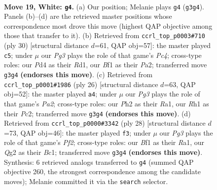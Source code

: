 \documentclass[11pt]{article}
\begin{document}
\begin{figure}[p]\centering
\begin{subfigure}{0.46\textwidth}\centering
\resizebox{\linewidth}{!}{%
\newchessgame
\chessboard[
  setfen={rnb3kr/1p1n4/2p1p3/p2p2qp/N2P4/6P1/PPP2NQP/1K1R1B1R w - - 5 19},
  showmover=false,
  pgfstyle=straightmove, color=movearrow, markmove={g3-g4}
]}
\caption{}
\end{subfigure}\hfill
\begin{subfigure}{0.46\textwidth}\centering
\resizebox{\linewidth}{!}{%
\newchessgame
\chessboard[
  setfen={r3k2r/1pq1bppp/pn2pn2/8/1PPN4/2N1B2P/P3QPP1/R2R2K1 w kq - 1 16},
  showmover=false,
  pgfstyle=straightmove, color=movearrow, markmove={c4-c5}
]}
\caption{}
\end{subfigure}
\\[4pt]
\begin{subfigure}{0.46\textwidth}\centering
\resizebox{\linewidth}{!}{%
\newchessgame
\chessboard[
  setfen={r3k2r/p3bppp/q1p1pn2/3p4/3P1B2/5Q1P/PPP1NPP1/R4RK1 w kq - 2 14},
  showmover=false,
  pgfstyle=straightmove, color=movearrow, markmove={a2-a4}
]}
\caption{}
\end{subfigure}\hfill
\begin{subfigure}{0.46\textwidth}\centering
\resizebox{\linewidth}{!}{%
\newchessgame
\chessboard[
  setfen={r3k2r/pp1nn1p1/5q1p/3p4/3Pp3/2P4N/P4PPP/R1BQ1RK1 w kq - 2 15},
  showmover=false,
  pgfstyle=straightmove, color=movearrow, markmove={f2-f3}
]}
\caption{}
\end{subfigure}
\caption{\textbf{Move 19, White: \texttt{g4}.} (a) Our position; Melanie plays \texttt{g4} (\texttt{g3g4}). Panels (b)--(d) are the retrieved master positions whose correspondence most drove this move (highest QAP objective among those that transfer to it). (b) Retrieved from \texttt{ccrl\_top\_p0003\#710} (ply 30) [structural distance $d$=61, QAP obj=57]: the master played \texttt{c5}; under $\mu$ our \emph{Pg3} plays the role of that game's \emph{Pc4}; cross-type roles: our \emph{P}d4 as their \emph{R}d1, our \emph{B}f1 as their \emph{P}a2; transferred move \texttt{g3g4} \textbf{(endorses this move)}. (c) Retrieved from \texttt{ccrl\_top\_p0001\#1986} (ply 26) [structural distance $d$=63, QAP obj=52]: the master played \texttt{a4}; under $\mu$ our \emph{Pg3} plays the role of that game's \emph{Pa2}; cross-type roles: our \emph{P}h2 as their \emph{R}a1, our \emph{R}h1 as their \emph{P}c2; transferred move \texttt{g3g4} \textbf{(endorses this move)}. (d) Retrieved from \texttt{ccrl\_top\_p0000\#3342} (ply 28) [structural distance $d$=73, QAP obj=46]: the master played \texttt{f3}; under $\mu$ our \emph{Pg3} plays the role of that game's \emph{Pf2}; cross-type roles: our \emph{B}f1 as their \emph{R}a1, our \emph{Q}g2 as their \emph{B}c1; transferred move \texttt{g3g4} \textbf{(endorses this move)}. Synthesis: 6 retrieved analogs transferred to \texttt{g4} (summed QAP objective 260, the strongest correspondence among the candidate moves); Melanie committed it via the \texttt{search} selector.}
\label{fig:thought-m36}
\end{figure}
\end{document}
